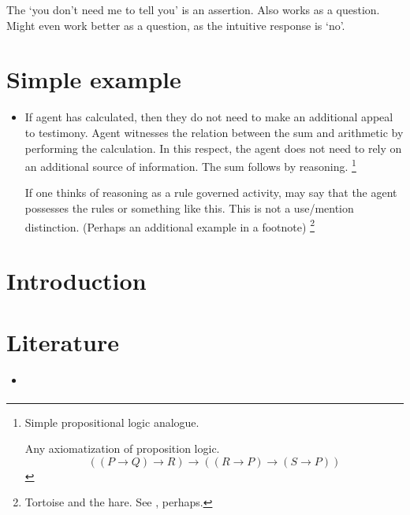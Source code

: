 \documentclass[10pt]{article}
\begin{document}
{
  \color{red}
  The `you don't need me to tell you' is an assertion.
  Also works as a question.
  Might even work better as a question, as the intuitive response is `no'.
  
}





\section{Simple example}
\label{sec:simple-example}



\begin{itemize}
\item If agent has calculated, then they do not need to make an additional appeal to testimony.
  Agent witnesses the relation between the sum and arithmetic by performing the calculation.
  In this respect, the agent does not need to rely on an additional source of information.
  The sum follows by reasoning.\nolinebreak
  \footnote{
    Simple propositional logic analogue.

    Any axiomatization of proposition logic.
    \[
      ((P \rightarrow Q) \rightarrow R) \rightarrow ((R \rightarrow P) \rightarrow (S \rightarrow P))
    \]
    \cite{lukasiewicz:1948aa}
  }

  {
    \color{red}
    If one thinks of reasoning as a rule governed activity, may say that the agent possesses the rules or something like this.
  }
  This is not a use/mention distinction. (Perhaps an additional example in a footnote)\nolinebreak
  \footnote{
    Tortoise and the hare.
    See \cite{Simchen:2001aa}, perhaps.
  }
\end{itemize}

\newpage


\section{Introduction}
\label{sec:introduction}



\section{Literature}
\label{sec:literature}

\begin{itemize}
\item \textcite{Worsnip:2018aa}
\end{itemize}
\end{document}

